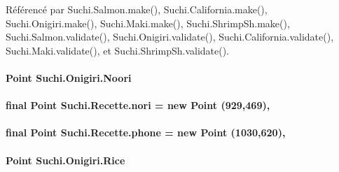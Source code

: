 Référencé par Suchi.\+Salmon.\+make(), Suchi.\+California.\+make(), Suchi.\+Onigiri.\+make(), Suchi.\+Maki.\+make(), Suchi.\+Shrimp\+Sh.\+make(), Suchi.\+Salmon.\+validate(), Suchi.\+Onigiri.\+validate(), Suchi.\+California.\+validate(), Suchi.\+Maki.\+validate(), et Suchi.\+Shrimp\+Sh.\+validate().

\hypertarget{classSuchi_1_1Onigiri_a3a2c86dd6581e11512902fa76837f03a}{}
\paragraph[{Noori}]{\setlength{\rightskip}{0pt plus 5cm}Point Suchi.\+Onigiri.\+Noori\hspace{0.3cm}{\ttfamily [package]}}\label{classSuchi_1_1Onigiri_a3a2c86dd6581e11512902fa76837f03a}
\hypertarget{classSuchi_1_1Recette_ab86193f9fe4491190e232c4e7f93bed5}{}
\paragraph[{nori}]{\setlength{\rightskip}{0pt plus 5cm}final Point Suchi.\+Recette.\+nori = new Point (929,469)\hspace{0.3cm}{\ttfamily [protected]}, {\ttfamily [inherited]}}\label{classSuchi_1_1Recette_ab86193f9fe4491190e232c4e7f93bed5}
\hypertarget{classSuchi_1_1Recette_a89465932bd180079526cfc1f8b8af456}{}
\paragraph[{phone}]{\setlength{\rightskip}{0pt plus 5cm}final Point Suchi.\+Recette.\+phone = new Point (1030,620)\hspace{0.3cm}{\ttfamily [protected]}, {\ttfamily [inherited]}}\label{classSuchi_1_1Recette_a89465932bd180079526cfc1f8b8af456}
\hypertarget{classSuchi_1_1Onigiri_a564559717a3a63623d2b58163ce1ec85}{}
\paragraph[{Rice}]{\setlength{\rightskip}{0pt plus 5cm}Point Suchi.\+Onigiri.\+Rice\hspace{0.3cm}{\ttfamily [private]}}\label{classSuchi_1_1Onigiri_a564559717a3a63623d2b58163ce1ec85}
\hypertarget{classSuchi_1_1Recette_a36ec8dc3a30b3f1dba74d3aa354f9f11}{}
